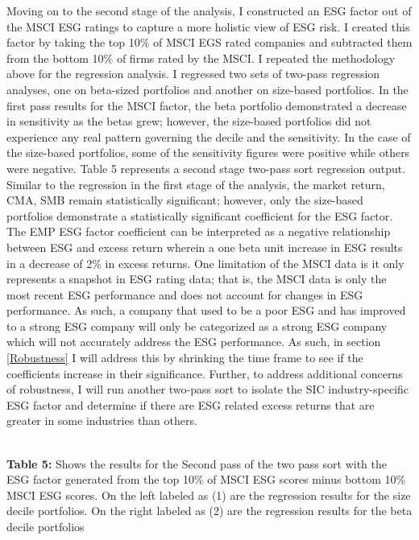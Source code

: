Moving on to the second stage of the analysis, I constructed an ESG factor out of the MSCI ESG ratings to capture a more holistic view of ESG risk. I created this factor by taking the top 10\% of MSCI EGS rated companies and subtracted them from the bottom 10\% of firms rated by the MSCI. I repeated the methodology above for the regression analysis. I  regressed two sets of two-pass regression analyses, one on beta-sized portfolios and another on size-based portfolios. In the first pass results for the MSCI factor, the beta portfolio demonstrated a decrease in sensitivity as the betas grew; however, the size-based portfolios did not experience any real pattern governing the decile and the sensitivity. In the case of the size-based portfolios, some of the sensitivity figures were positive while others were negative. Table 5 represents a second stage two-pass sort regression output. Similar to the regression in the first stage of the analysis, the market return, CMA, SMB remain statistically significant; however, only the size-based portfolios demonstrate a statistically significant coefficient for the ESG factor.  The EMP ESG factor coefficient can be interpreted as a negative relationship between ESG and excess return wherein a one beta unit increase in ESG results in a decrease of 2\% in excess returns. One limitation of the MSCI data is it only represents a snapshot in ESG rating data; that is, the MSCI data is only the most recent ESG performance and does not account for changes in ESG performance. As such, a company that used to be a  poor ESG and has improved to a strong ESG company will only be categorized as a strong ESG company which will not accurately address the ESG performance.  As such, in section \ref{Robustness} I will address this by shrinking the time frame to see if the coefficients increase in their significance. Further,  to address additional concerns of robustness, I will run another two-pass sort to isolate the SIC industry-specific ESG factor and determine if there are ESG related excess returns that are greater in some industries than others. 

\begin{center}
    \paperspacingnarrow
    
    \\
    \textbf{Table 5:} Shows the results for the Second pass of the two pass sort with the ESG factor generated from the top 10\% of MSCI ESG scores minus bottom 10\% MSCI ESG scores. On the left labeled as (1) are the regression results for the size decile portfolios. On the right labeled as (2) are the regression results for the beta decile portfolios
    
    \paperspacingwide
\end{center}
